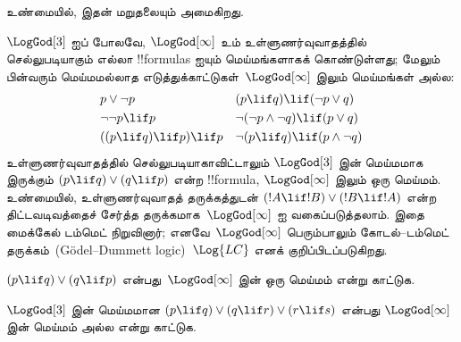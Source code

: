 \documentclass[../../../include/open-logic-section]{subfiles}
\begin{document}
உண்மையில், இதன் மறுதலையும் அமைகிறது.

$\LogGod[3]$ ஐப் போலவே, $\LogGod[\infty]$ உம் உள்ளுணர்வுவாதத்தில்
செல்லுபடியாகும் எல்லா !!{formula}s ஐயும் மெய்மங்களாகக் கொண்டுள்ளது;
மேலும் பின்வரும் மெய்மமல்லாத எடுத்துக்காட்டுகள்~$\LogGod[\infty]$ இலும்
மெய்மங்கள் அல்ல:
\begin{align*}
  & p \lor \lnot p && (p \lif q) \lif (\lnot p \lor q) \\
  & \lnot\lnot p \lif p && \lnot(\lnot p \land \lnot q) \lif (p \lor q) \\
  & ((p \lif q) \lif p) \lif p && \lnot(p \lif q) \lif (p \land \lnot q)
\end{align*}
உள்ளுணர்வுவாதத்தில் செல்லுபடியாகாவிட்டாலும் $\LogGod[3]$ இன் மெய்மமாக
இருக்கும் $(p \lif q) \lor (q \lif p)$ என்ற !!{formula},
$\LogGod[\infty]$ இலும் ஒரு மெய்மம். உண்மையில், உள்ளுணர்வுவாதத்
தருக்கத்துடன் $(!A \lif !B) \lor (!B \lif !A)$ என்ற திட்டவடிவத்தைச்
சேர்த்த தருக்கமாக~$\LogGod[\infty]$ ஐ வகைப்படுத்தலாம். இதை மைக்கேல்
டம்மெட் நிறுவினார்; எனவே~$\LogGod[\infty]$ பெரும்பாலும் கோடல்--டம்மெட்
தருக்கம்~(G\"odel--Dummett logic)~$\Log{LC}$ எனக் குறிப்பிடப்படுகிறது.

\begin{prob}
  $(p \lif q) \lor (q \lif p)$ என்பது~$\LogGod[\infty]$ இன் ஒரு
  மெய்மம் என்று காட்டுக.
\end{prob}

\begin{prob}
  $\LogGod[3]$ இன் மெய்மமான
  $(p \lif q) \lor (q \lif r) \lor (r \lif s)$ என்பது
  $\LogGod[\infty]$ இன் மெய்மம் அல்ல என்று காட்டுக.
\end{prob}
\end{document}

